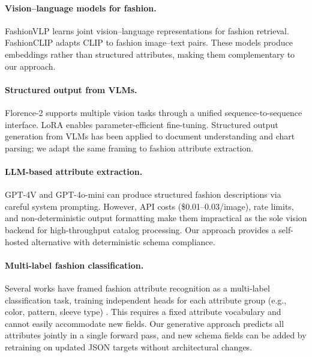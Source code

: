 \documentclass[10pt,twocolumn]{article}
\begin{document}
\paragraph{Vision--language models for fashion.}
FashionVLP \citep{goenka2022fashionvlp} learns joint vision--language
representations for fashion retrieval.  FashionCLIP
\citep{chia2022fashionclip} adapts CLIP \citep{radford2021clip} to fashion
image--text pairs.  These models produce embeddings rather than structured
attributes, making them complementary to our approach.

\paragraph{Structured output from VLMs.}
Florence-2 \citep{xiao2024florence2} supports multiple vision tasks through
a unified sequence-to-sequence interface.  LoRA \citep{hu2022lora} enables
parameter-efficient fine-tuning.  Structured output generation from VLMs has been applied to document
understanding \citep{xiao2024florence2} and chart parsing; we adapt the
same framing to fashion attribute extraction.

\paragraph{LLM-based attribute extraction.}
GPT-4V and GPT-4o-mini can produce structured fashion descriptions via
careful system prompting.  However, API costs (\$0.01--0.03/image), rate
limits, and non-deterministic output formatting make them impractical as the
sole vision backend for high-throughput catalog processing.  Our approach
provides a self-hosted alternative with deterministic schema compliance.

\paragraph{Multi-label fashion classification.}
Several works have framed fashion attribute recognition as a multi-label
classification task, training independent heads for each attribute group
(e.g., color, pattern, sleeve type) \citep{liu2016deepfashion}.  This
requires a fixed attribute vocabulary and cannot easily accommodate new
fields.  Our generative approach predicts all attributes jointly in a
single forward pass, and new schema fields can be added by retraining on
updated JSON targets without architectural changes.

\end{document}
